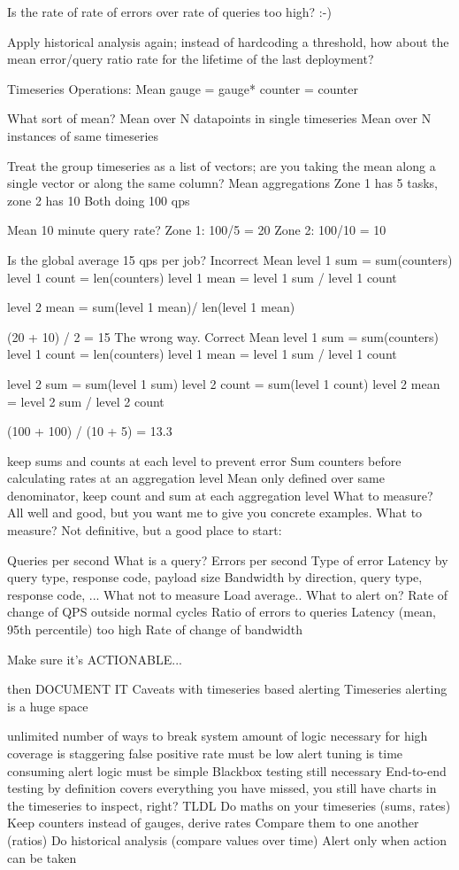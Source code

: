 \documentclass[online,helvetica]{chaksem}
\begin{document}
Is the rate of rate of errors over rate of queries too high? :-)

Apply historical analysis again; instead of hardcoding a threshold, how about the mean error/query ratio rate for the lifetime of the last deployment?

Timeseries Operations: Mean
gauge = gauge*
counter = counter


What sort of mean?
Mean over N datapoints in single timeseries
Mean over N instances of same timeseries

Treat the group timeseries as a list of vectors; are you taking the mean along a single vector or along the same column?
Mean aggregations
Zone 1 has 5 tasks, zone 2 has 10
Both doing 100 qps

Mean 10 minute query rate?
Zone 1: 100/5 = 20
Zone 2: 100/10 = 10

Is the global average 15 qps per job?
Incorrect Mean
level 1 sum = sum(counters)
level 1 count = len(counters)
level 1 mean = level 1 sum / level 1 count

level 2 mean = sum(level 1 mean)/ len(level 1 mean)

(20 + 10)  / 2 = 15
The wrong way.
Correct Mean
level 1 sum = sum(counters)
level 1 count = len(counters)
level 1 mean = level 1 sum / level 1 count

level 2 sum = sum(level 1 sum)
level 2 count = sum(level 1 count)
level 2 mean = level 2 sum / level 2 count

(100 + 100) / (10 + 5) = 13.3

keep sums and counts at each level to prevent error
Sum counters before calculating rates at an aggregation level
Mean only defined over same denominator, keep count and sum at each aggregation level
What to measure?
All well and good, but you want me to give you concrete examples.
What to measure?
Not definitive, but a good place to start:

Queries per second
What is a query?
Errors per second
Type of error
Latency
by query type, response code, payload size
Bandwidth
by direction, query type, response code, ...
What not to measure
Load average..
What to alert on?
Rate of change of QPS outside normal cycles
Ratio of errors to queries
Latency (mean, 95th percentile) too high
Rate of change of bandwidth

Make sure it's ACTIONABLE...

then DOCUMENT IT
Caveats with timeseries based alerting
Timeseries alerting is a huge space

unlimited number of ways to break system
amount of logic necessary for high coverage is staggering
false positive rate must be low
alert tuning is time consuming
alert logic must be simple
Blackbox testing still necessary
End-to-end testing by definition covers everything you have missed,
you still have charts in the timeseries to inspect, right?
TLDL
Do maths on your timeseries (sums, rates)
Keep counters instead of gauges, derive rates
Compare them to one another (ratios)
Do historical analysis (compare values over time)
Alert only when action can be taken
\end{document}
